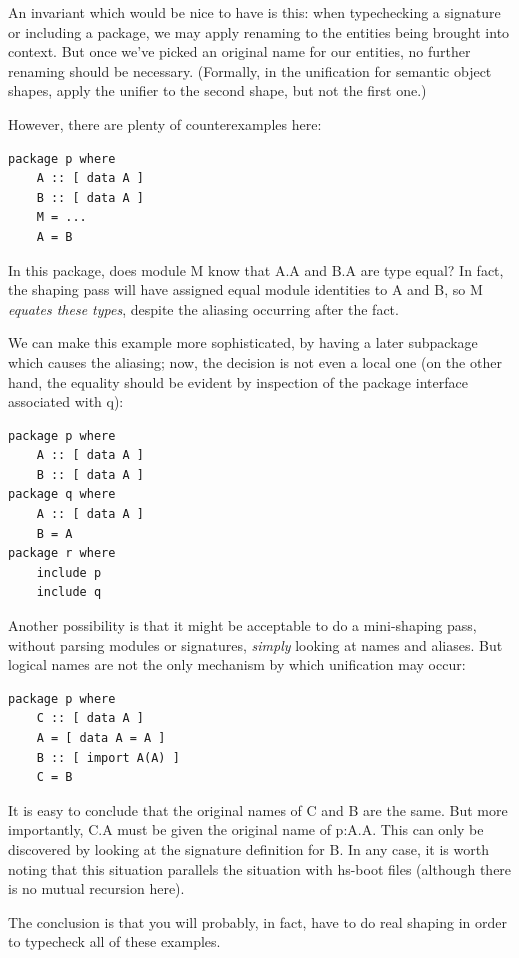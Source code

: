 \documentclass{article}
\begin{document}
An invariant which would be nice to have is this: when typechecking a
signature or including a package, we may apply renaming to the entities
being brought into context.  But once we've picked an original name for
our entities, no further renaming should be necessary. (Formally, in the
unification for semantic object shapes, apply the unifier to the second
shape, but not the first one.)

However, there are plenty of counterexamples here:

\begin{verbatim}
package p where
    A :: [ data A ]
    B :: [ data A ]
    M = ...
    A = B
\end{verbatim}

In this package, does module M know that A.A and B.A are type equal?  In
fact, the shaping pass will have assigned equal module identities to A
and B, so M \emph{equates these types}, despite the aliasing occurring
after the fact.

We can make this example more sophisticated, by having a later
subpackage which causes the aliasing; now, the decision is not even a
local one (on the other hand, the equality should be evident by inspection
of the package interface associated with q):

\begin{verbatim}
package p where
    A :: [ data A ]
    B :: [ data A ]
package q where
    A :: [ data A ]
    B = A
package r where
    include p
    include q
\end{verbatim}

Another possibility is that it might be acceptable to do a mini-shaping
pass, without parsing modules or signatures, \emph{simply} looking at
names and aliases.  But logical names are not the only mechanism by
which unification may occur:

\begin{verbatim}
package p where
    C :: [ data A ]
    A = [ data A = A ]
    B :: [ import A(A) ]
    C = B
\end{verbatim}

It is easy to conclude that the original names of C and B are the same.  But
more importantly, C.A must be given the original name of p:A.A.  This can only
be discovered by looking at the signature definition for B. In any case, it
is worth noting that this situation parallels the situation with hs-boot
files (although there is no mutual recursion here).

The conclusion is that you will probably, in fact, have to do real
shaping in order to typecheck all of these examples.
\end{document}
